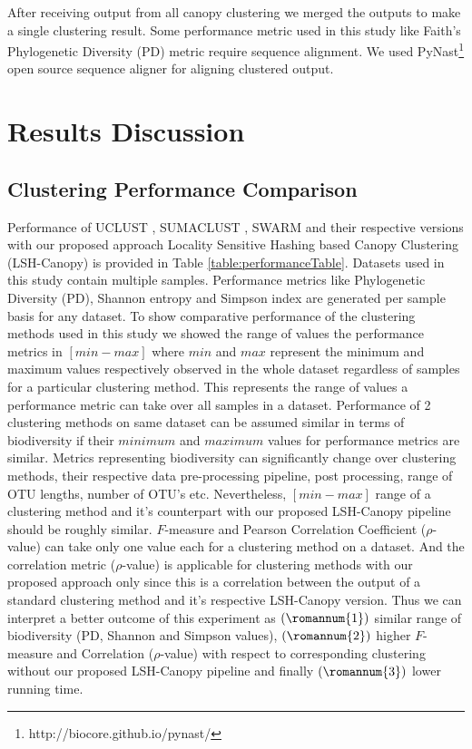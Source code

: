\documentclass[10pt, conference, compsocconf]{IEEEtran}
\begin{document}
After receiving output from all canopy clustering we merged the outputs to make a single clustering result. Some performance metric used in this study like Faith’s Phylogenetic Diversity (PD) metric require sequence alignment. We used PyNast\footnote{http://biocore.github.io/pynast/} \cite{MARPynast} open source sequence aligner for aligning clustered output.    


\section{Results Discussion} 
\subsection{\textbf{Clustering Performance Comparison}}
Performance of UCLUST \cite{MARuclust}, SUMACLUST \cite{MARSumaclust}, SWARM \cite{MARSwarm} and their respective versions with our proposed approach Locality Sensitive Hashing based Canopy Clustering (LSH-Canopy) is provided in Table \ref{table:performanceTable}. Datasets used in this study contain multiple samples. Performance metrics like Phylogenetic Diversity (PD), Shannon entropy and Simpson index are generated per sample basis for any dataset. To show comparative performance of the clustering methods used in this study we showed the range of values the performance metrics in $\left[min-max\right]$ where $min$ and $max$ represent the minimum and maximum values respectively observed in the whole dataset regardless of samples for a particular clustering method. This represents the range of values a performance metric can take over all samples in a dataset. Performance of 2 clustering methods on same dataset can be assumed similar in terms of biodiversity if their $minimum$ and $maximum$ values for performance metrics are similar. Metrics representing biodiversity can significantly change over clustering methods, their respective data pre-processing pipeline, post processing, range of OTU lengths, number of OTU's etc. Nevertheless, $\left[min-max\right]$ range of a clustering method and it's counterpart with our proposed LSH-Canopy pipeline should be roughly similar. $F$-measure and Pearson Correlation Coefficient ($\rho$-value) can take only one value each for a clustering method on a dataset. And the correlation metric ($\rho$-value) is applicable for clustering methods with our proposed approach only since this is a correlation between the output of a standard clustering method and it's respective LSH-Canopy version. Thus we can interpret a better outcome of this experiment as $(\romannum{1})$  similar range of biodiversity (PD, Shannon and Simpson values), $(\romannum{2})$ higher $F$-measure and Correlation ($\rho$-value) with respect to corresponding clustering without our proposed LSH-Canopy pipeline and finally $(\romannum{3})$ lower running time. 
\end{document}
